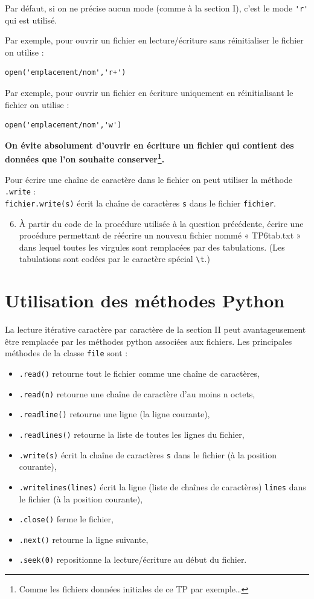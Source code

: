 Par défaut, si on ne précise aucun mode (comme à la section I), c'est le mode \verb|'r'| qui est utilisé. 

Par exemple, pour ouvrir un fichier en lecture/écriture sans réinitialiser le fichier on utilise :
\begin{verbatim}
open('emplacement/nom','r+') 
\end{verbatim}

Par exemple, pour ouvrir un fichier en écriture uniquement en réinitialisant le fichier on utilise :
\begin{verbatim}
open('emplacement/nom','w') 
\end{verbatim}

\textbf{On évite absolument d'ouvrir en écriture un fichier qui contient des données que l'on souhaite conserver\footnote{Comme les fichiers données initiales de ce TP par exemple\dots}.}

Pour écrire une chaîne de caractère dans le fichier on peut utiliser la méthode \verb|.write| :\\
\verb|fichier.write(s)| écrit la chaîne de caractères \verb|s| dans le fichier \verb|fichier|.

\begin{enumerate}
\setcounter{enumi}{5}
 \item À partir du code de la procédure utilisée à la question précédente, écrire une procédure permettant de réécrire un nouveau fichier nommé « TP6tab.txt » dans lequel toutes les virgules sont remplacées par des tabulations. (Les tabulations sont codées par le caractère spécial \verb|\t|.)
\end{enumerate}

\section*{Utilisation des méthodes Python}

La lecture itérative caractère par caractère de la section II peut avantageusement être remplacée par les méthodes python associées aux fichiers. Les principales méthodes de la classe \verb|file| sont :
\begin{itemize}
\item \verb|.read()| retourne tout le fichier comme une chaîne de caractères,
\item \verb|.read(n)| retourne une chaîne de caractère d’au moins n octets,
\item \verb|.readline()| retourne une ligne (la ligne courante),
\item \verb|.readlines()| retourne la liste de toutes les lignes du fichier,
\item \verb|.write(s)| écrit la chaîne de caractères \verb|s| dans le fichier (à la position courante),
\item \verb|.writelines(lines)| écrit la ligne (liste de chaînes de caractères) \verb|lines| dans le fichier (à la position courante),
\item \verb|.close()| ferme le fichier,
\item \verb|.next()| retourne la ligne suivante,
\item \verb|.seek(0)| repositionne la lecture/écriture au début du fichier.
\end{itemize}

